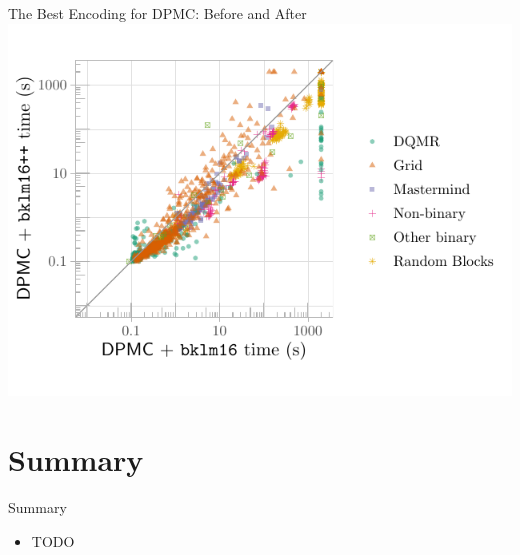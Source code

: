\documentclass{beamer}
\begin{document}
\begin{frame}{The Best Encoding for DPMC: Before and After}
  \centering
  \includegraphics[width=\textwidth]{scatter2}
\end{frame}


\section{Summary}

\begin{frame}{Summary}
  \begin{itemize}
  \item TODO
  \end{itemize}
\end{frame}
\end{document}
